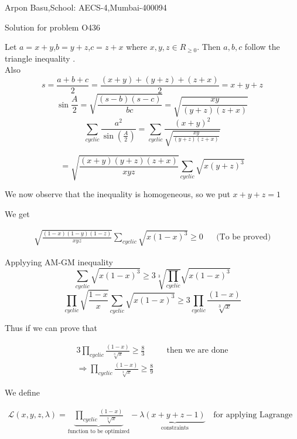 \documentclass[a4paper,10pt]{article}
\begin{document}
\begin{center}


Arpon Basu,School: AECS-4,Mumbai-400094

Solution for problem O436
\end{center}


Let $a=x+y$,$b=y+z$,$c=z+x$ where $x,y,z \in R_{\ge 0}$. Then $a,b,c$ follow the triangle inequality .\\
Also  
$$ s=\frac{a+b+c}{2}=\frac{(x+y)+(y+z)+(z+x)}{2}=x+y+z$$
$$ \sin \frac{A}{2}=\sqrt{\frac{(s-b)(s-c)}{bc}}=\sqrt{\frac{xy}{(y+z)(z+x)}}$$
$$  \sum_{cyclic}\frac{a^2}{\sin(\frac{A}{2})} = \sum_{cyclic} \frac{(x+y)^2}{\sqrt{\frac{xy}{(y+z)(z+x)}}}  $$

$$ =\sqrt{\frac{(x+y)(y+z)(z+x)}{xyz}} \sum_{cyclic} \sqrt{x(y+z)^3}  $$

We now observe that the inequality is homogeneous, so we put $x+y+z=1$

We get 

\begin{align*}
 \sqrt{\frac{(1-x)(1-y)(1-z)}{xyz}}\sum_{cyclic}\sqrt{x(1-x)^3} \ge 0 &&\text{(To be proved)}
\end{align*}

Applyying AM-GM inequality 
$$ \sum_{cyclic}\sqrt{x(1-x)^3} \ge 3 \sqrt[3]{\prod_{cyclic}}\sqrt{x(1-x)^3}  $$
$$ \prod_{cyclic} \sqrt{\frac{1-x}{x}} \sum_{cyclic} \sqrt{x(1-x)^3} \ge 3 \prod_{cyclic} \frac{(1-x)}{\sqrt[3]{x}} $$

Thus if we can prove that 

\begin{align*}
 3\prod_{cyclic}\frac{(1-x)}{\sqrt[3]{x}} \ge \frac{8}{3} &&\text{then we are done} \\
 \Rightarrow \prod_{cyclic}\frac{(1-x)}{\sqrt[3]{x}} \ge \frac{8}{9}
\end{align*}



We define 
 
\begin{align*}
    \mathcal{L}(x,y,z,\lambda)=\underbrace{\prod_{cyclic}\frac{(1-x)}{\sqrt[3]{x}}}_\text{function to be optimized} -\lambda \underbrace{ (x+y+z-1)}_\text{constraints} &&\text{for applying Lagrange multiplier}   
\end{align*}
\end{document}

